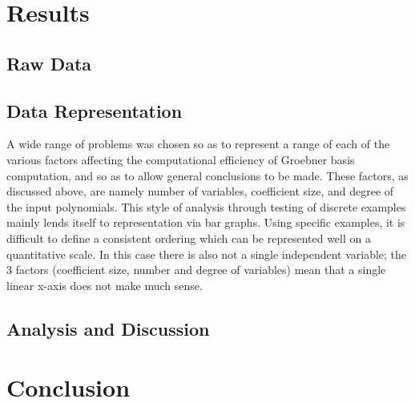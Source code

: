 \documentclass{article}
\begin{document}
\section{Results}
\subsection{Raw Data}
\subsection{Data Representation}

\noindent

\par A wide range of problems was chosen so as to represent a range of each of the various factors affecting the computational efficiency of Groebner basis computation, and so as to allow general conclusions to be made.  These factors, as discussed above, are namely number of variables, coefficient size, and degree of the input polynomials.  
This style of analysis through testing of discrete examples mainly lends itself to representation via bar graphs.  Using specific examples, it is difficult to define a consistent ordering which can be represented well on a quantitative scale.  In this case there is also not a single independent variable; the 3 factors (coefficient size, number and degree of variables) mean that a single linear x-axis does not make much sense.  
\subsection{Analysis and Discussion}

\section{Conclusion}


\begin{appendix}
  \listoffigures
\end{appendix}
\end{document}
